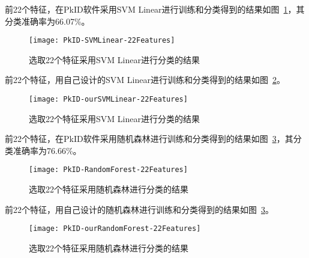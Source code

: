 前22个特征，在PkID软件采用SVM Linear进行训练和分类得到的结果如图~\ref{fig:PkID-SVMLinear-22Features}，其分类准确率为66.07\%。

\begin{figure}[!ht]
\centering
\texttt{[image: PkID-SVMLinear-22Features]}
\caption{选取22个特征采用SVM Linear进行分类的结果}
\label{fig:PkID-SVMLinear-22Features}
\end{figure}

前22个特征，用自己设计的SVM Linear进行训练和分类得到的结果如图~\ref{fig:PkID-ourSVMLinear-22Features}。

\begin{figure}[!ht]
\centering
\texttt{[image: PkID-ourSVMLinear-22Features]}
\caption{选取22个特征采用SVM Linear进行分类的结果}
\label{fig:PkID-ourSVMLinear-22Features}
\end{figure}

前22个特征，在PkID软件采用随机森林进行训练和分类得到的结果如图~\ref{fig:PkID-RandomForest-22Features}，其分类准确率为76.66\%。

\begin{figure}[!ht]
\centering
\texttt{[image: PkID-RandomForest-22Features]}
\caption{选取22个特征采用随机森林进行分类的结果}
\label{fig:PkID-RandomForest-22Features}
\end{figure}

前22个特征，用自己设计的随机森林进行训练和分类得到的结果如图~\ref{fig:PkID-RandomForest-22Features}。

\begin{figure}[!ht]
\centering
\texttt{[image: PkID-ourRandomForest-22Features]}
\caption{选取22个特征采用随机森林进行分类的结果}
\label{fig:PkID-ourRandomForest-22Features}
\end{figure}







